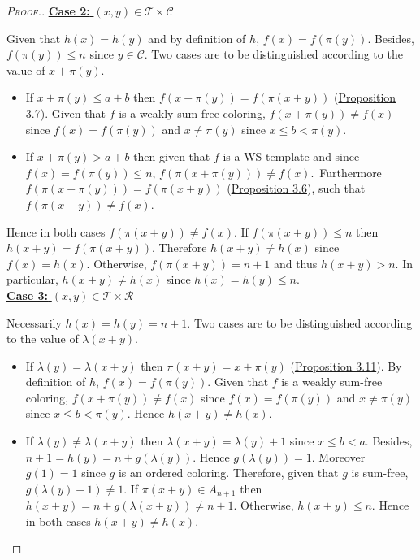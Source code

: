 \begin{proof}[\textsc{Proof.}]
\noindent \underline{\textbf{Case 2:} \((x,y) \in \mathcal{T} \times \mathcal{C}\)}
\par
Given that \(h(x) = h(y)\) and by definition of \(h\), \(f(x) = f(\pi(y))\). Besides, \(f(\pi(y)) \leqslant n\) since
\(y \in \mathcal{C}\). Two cases are to be distinguished according to the value of \(x + \pi(y)\).
\begin{itemize}
\item \begin{sloppypar}
	If \(x + \pi(y) \leqslant a + b\) then \(f(x + \pi(y)) = f(\pi(x + y))\) (\hyperref[prop3]{Proposition 3.7}). Given that \(f\) is
	a weakly sum-free coloring, \(f(x+\pi(y)) \neq f(x)\) since \(f(x)=f(\pi(y))\) and \(x \neq \pi(y)\) since
	\({x \leqslant b < \pi(y)}\).
	\end{sloppypar}
\item \begin{sloppypar}
	If \(x+\pi(y)> a+b\) then given that \(f\) is a WS-template and since \({f(x) = f(\pi(y)) \leqslant n}\),
	\({f(\pi(x+\pi(y))) \neq f(x)}\).~Furthermore \({f(\pi(x+\pi(y))) = f(\pi(x+y))}\) (\hyperref[prop2]{Proposition 3.6}), such that
	\({f(\pi(x+ y)) \neq f(x)}\).
	\end{sloppypar}
\end{itemize}
\par
Hence in both cases \(f(\pi(x+y)) \neq f(x)\). If  \(f(\pi(x+y)) \leqslant n\) then \(h(x+y) = f(\pi(x+y))\). Therefore
\(h(x+y) \neq h(x)\) since \(f(x) = h(x)\). Otherwise, \(f(\pi(x+y)) = n + 1\) and thus \(h(x+y) > n\). In particular,
\(h(x + y) \neq h(x)\) since \(h(x) = h(y) \leqslant n\). \\

\noindent \underline{\textbf{Case 3:} \((x,y) \in \mathcal{T} \times \mathcal{R}\)}
\par
Necessarily \(h(x) = h(y) = n + 1\). Two cases are to be distinguished according to the value of \(\lambda(x+y)\).
\begin{itemize}
\item If \(\lambda(y)=\lambda(x+y)\) then \(\pi(x + y) = x + \pi(y)\) (\hyperref[prop6]{Proposition 3.11}). By definition of
	\(h\), \(f(x) = f(\pi(y))\). Given that \(f\) is a weakly sum-free coloring, \(f(x + \pi(y)) \neq f(x)\) since
	\(f(x) = f(\pi(y))\) and \(x \neq \pi(y)\) since \({x \leqslant b < \pi(y)}\). Hence \(h(x + y) \neq h(x)\).
\item If \(\lambda(y) \neq \lambda(x + y)\) then \(\lambda(x + y) = \lambda(y) + 1\) since \(x \leqslant b < a\).
	Besides, \(n + 1 = h(y) = n +  g(\lambda(y))\). Hence \(g(\lambda(y)) = 1\). Moreover \(g(1) = 1\) since \(g\)
	is an ordered coloring. Therefore, given that \(g\) is sum-free, \(g(\lambda(y) + 1) \neq 1\). If \(\pi(x + y) \in
	A_{n + 1}\) then \(h(x + y) = n + g(\lambda(x + y)) \neq n + 1\). Otherwise, \(h(x + y) \leqslant n\). Hence
	in both cases \(h(x + y) \neq h(x)\).
\end{itemize}


\end{proof}
